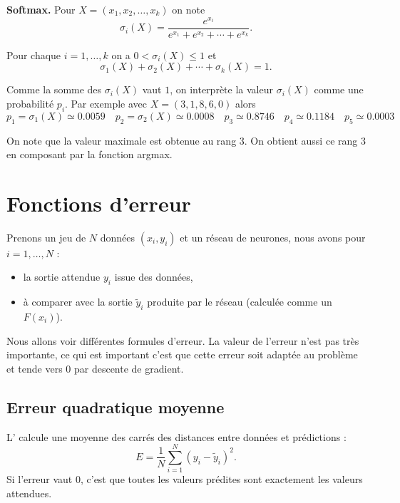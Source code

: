 \documentclass[11pt,class=report,crop=false]{standalone}
\begin{document}
\textbf{Softmax.}
Pour $X = (x_1,x_2,\ldots,x_k)$ on note
$$\sigma_i (X) = \frac{e^{x_i}}{ e^{x_1} + e^{x_2} + \cdots + e^{x_k}}.$$

\begin{proposition}
Pour chaque $i=1,\ldots,k$ on a 
$0 < \sigma_i(X) \le 1$ et 
$$\sigma_1(X) + \sigma_2(X) + \cdots + \sigma_k(X)=1.$$
\end{proposition}

Comme la somme des $\sigma_i(X)$ vaut $1$, on interprète la valeur $\sigma_i(X)$ comme une probabilité $p_i$.
Par exemple avec $X = (3,1,8,6,0)$ alors
$$
p_1 = \sigma_1(X) \simeq 0.0059 \quad
p_2 = \sigma_2(X) \simeq 0.0008 \quad
p_3 \simeq 0.8746 \quad
p_4 \simeq 0.1184 \quad
p_5 \simeq 0.0003$$

On note que la valeur maximale est obtenue au rang $3$. On obtient aussi ce rang $3$ en composant par la fonction argmax.


\section{Fonctions d'erreur}


Prenons un jeu de $N$ données $(x_i,y_i)$ et un réseau de neurones, nous avons pour $i=1,\ldots,N$ :
\begin{itemize}
  \item la sortie attendue $y_i$ issue des données,
  \item à comparer avec la sortie $\widetilde y_i$ produite par le réseau (calculée comme un $F(x_i)$). 
\end{itemize}

Nous allons voir différentes formules d'erreur. La valeur de l'erreur n'est pas très importante, ce qui est important c'est que cette erreur soit adaptée au problème et tende vers $0$ par descente de gradient.

\subsection{Erreur quadratique moyenne}

L' calcule une moyenne des carrés des distances entre données et prédictions :
$$E = \frac{1}{N} \sum_{i=1}^N (y_i-\widetilde y_i)^2.$$
Si l'erreur vaut $0$, c'est que toutes les valeurs prédites sont exactement les valeurs attendues.
  
\end{document}
